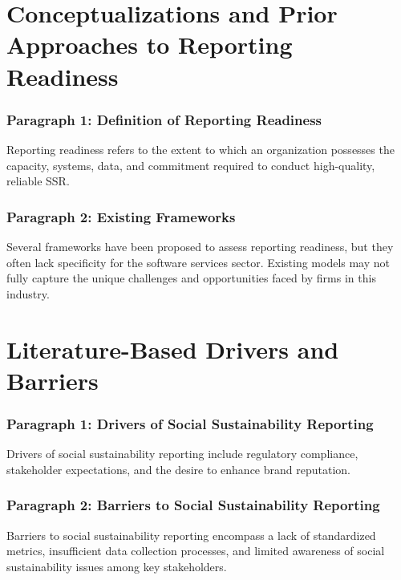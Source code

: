 \section{Conceptualizations and Prior Approaches to Reporting Readiness}
\subsubsection{Paragraph 1: Definition of Reporting Readiness}
Reporting readiness refers to the extent to which an organization possesses the capacity, systems, data,
and commitment required to conduct high-quality, reliable SSR.

\subsubsection{Paragraph 2: Existing Frameworks}
Several frameworks have been proposed to assess reporting readiness, 
but they often lack specificity for the software services sector. 
Existing models may not fully capture the unique challenges and opportunities faced by firms in this industry.

\section{Literature-Based Drivers and Barriers}
\subsubsection{Paragraph 1: Drivers of Social Sustainability Reporting}
Drivers of social sustainability reporting include regulatory compliance, stakeholder expectations, 
and the desire to enhance brand reputation.

\subsubsection{Paragraph 2: Barriers to Social Sustainability Reporting}
Barriers to social sustainability reporting encompass a lack of standardized metrics, 
insufficient data collection processes, and limited awareness of social sustainability issues among key stakeholders.
